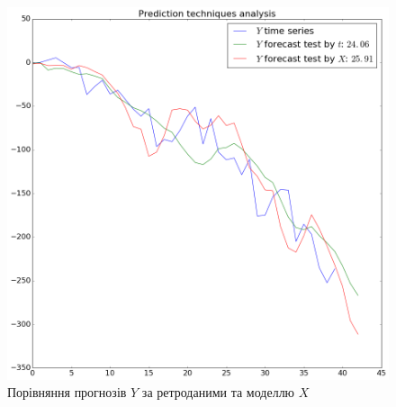 \begin{figure}[h!]
  \centering
  \includegraphics[width=\textwidth]{Coursework3_files/Coursework3_8_0.png}
  \caption{Порівняння прогнозів $Y$ за ретроданими та моделлю $X$}
  \label{fig:y:forecast:comparison}
\end{figure}
